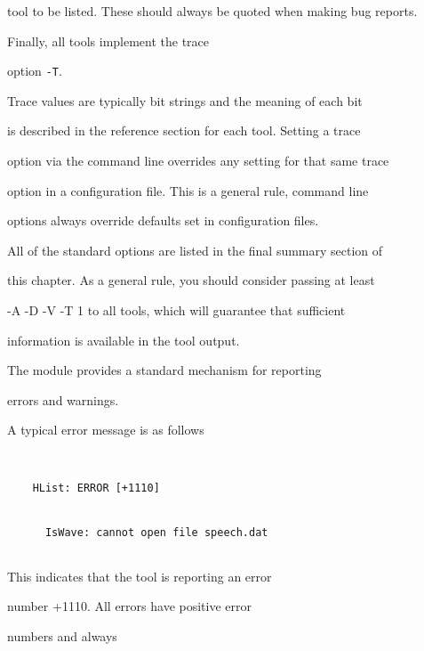 tool to be listed.  These should always be quoted when making bug reports.





Finally, all tools implement the trace 


option \texttt{-T}.


Trace values are typically bit strings and the meaning of each bit


is described in the reference section for each tool.  Setting a trace


option via the command line overrides any setting for that same trace


option in a configuration file.  This is a general rule, command line


options always override defaults set in configuration files.





All of the standard options are listed in the final summary section of


this chapter. As a general rule, you should consider passing at least


-A -D -V -T 1 to all tools, which will guarantee that sufficient


information is available in the tool output.













The  module provides a standard mechanism for reporting


errors and warnings.  


A typical error message is as follows


\begin{verbatim}


    HList: ERROR [+1110]


      IsWave: cannot open file speech.dat


\end{verbatim}


This indicates that the tool  is reporting an error


number +1110.  All errors have positive error 


numbers and always


